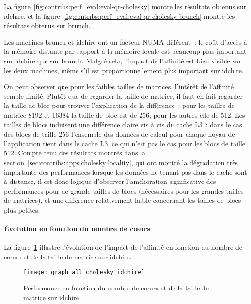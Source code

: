 La figure~\ref{fig:contribs:perf_eval:eval-qr-cholesky} montre les résultats obtenus sur idchire, et la figure~\ref{fig:contribs:perf_eval:eval-qr-cholesky-brunch} montre les résultats obtenus sur brunch.


Les machines brunch et idchire ont un facteur NUMA différent~: le coût d'accès à la mémoire distante par rapport à la mémoire locale est beaucoup plus important sur idchire que sur brunch.
Malgré cela, l'impact de l'affinité est bien visible sur les deux machines, même s'il est proportionnellement plus important sur idchire.

On peut observer que pour les faibles tailles de matrices, l'intérêt de l'affinité semble limité.
Plutôt que de regarder la taille de matrice, il faut en fait regarder la taille de bloc pour trouver l'explication de la différence~: pour les tailles de matrice 8192 et 16384 la taille de bloc est de 256, pour les autres elle de 512.
Les tailles de blocs induisent une différence claire vis à vis du cache L3~: dans le cas des blocs de taille 256 l'ensemble des données de calcul pour chaque noyau de l'application tient dans le cache L3, ce qui n'est pas le cas pour les blocs de taille 512.
Compte tenu des résultats montrés dans la section~\ref{sec:contribs:apps:cholesky:locality}, qui ont montré la dégradation très importante des performances lorsque les données ne tenant pas dans le cache sont à distance, il est donc logique d'observer l'amélioration significative des performances pour de grande tailles de blocs (nécessaires pour les grandes tailles de matrices), et une différence relativement faible concernant les tailles de blocs plus petites.


\paragraph{Évolution en fonction du nombre de cœurs}

La figure~\ref{fig:contribs:perf_eval:eval-cholesky-idchire} illustre l'évolution de l'impact de l'affinité en fonction du nombre de cœurs et de la taille de matrice sur idchire.


\begin{figure}[ht]
  \centering
  \texttt{[image: graph\_all\_cholesky\_idchire]}
  \caption{Performance en fonction du nombre de cœurs et de la taille de matrice sur idchire}\label{fig:contribs:perf_eval:eval-cholesky-idchire}
\end{figure}

